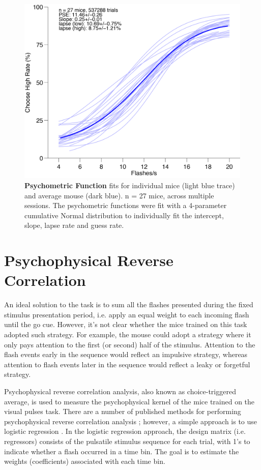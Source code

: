 \begin{figure}
  \centering
  	\includegraphics[width=\textwidth]{Figures/chapter2/PMF_pal_27_mice.png}
  \caption[Psychometric Functions]{\textbf{Psychometric Function} fits for individual mice (light blue trace) and average mouse (dark blue). n = 27 mice, across multiple sessions. The psychometric functions were fit with a 4-parameter cumulative Normal distribution to individually fit the intercept, slope, lapse rate and guess rate.}   
   \label{fig:pmfs}
\end{figure}
\section{Psychophysical Reverse Correlation}
An ideal solution to the task is to sum all the flashes presented during the fixed stimulus presentation period, i.e. apply an equal weight to each incoming flash until the go cue. However, it's not clear whether the mice trained on this task adopted such strategy. For example, the mouse could adopt a strategy where it only pays attention to the first (or second) half of the stimulus. Attention to the flash events early in the sequence would reflect an impulsive strategy, whereas attention to flash events later in the sequence would reflect a leaky or forgetful strategy.\par 
Psychophysical reverse correlation analysis, also known as choice-triggered average, is used to measure the psychophysical kernel of the mice trained on the visual pulses task. There are a number of published methods for performing psychophysical reverse correlation analysis \parencite{Huk2005,Nienborg2007,Raposo2012a,Brunton2013,Katz2016}; however, a simple approach is to use logistic regression  \parencite{Huk2005,Znamenskiy2013,Katz2016}. In the logistic regression approach, the design matrix (i.e. regressors) consists of the pulsatile stimulus sequence for each trial, with 1's to indicate whether a flash occurred in a time bin. The goal is to estimate the weights (coefficients) associated with each time bin.\par 

